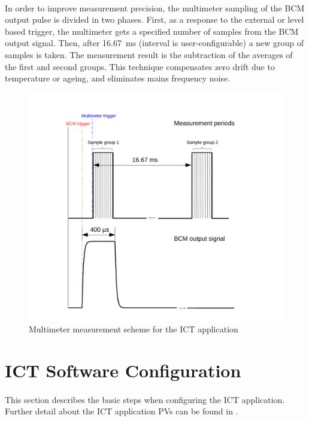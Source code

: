 \documentclass[openany]{article}
\begin{document}
	\paragraph{} In order to improve measurement precision, the multimeter sampling of the BCM output pulse is divided in two phases. First, as a response to the external or level based trigger, the multimeter gets a specified number of samples from the BCM output signal. Then, after \SI{16.67}{\milli\second} (interval is user-configurable) a new group of samples is taken. The measurement result is the subtraction of the averages of the first and second groups. This technique compensates zero drift due to temperature or ageing, and eliminates mains frequency noise.

	\begin{figure}[!h]
	\caption{Multimeter measurement scheme for the ICT application}
	\label{fig:meas-scheme}
	\centering
	\includegraphics[width=1.0\textwidth]{ict-meas-scheme-image}
	\end{figure}
\FloatBarrier

\section{ICT Software Configuration}

	\paragraph{} This section describes the basic steps when configuring the ICT application. Further detail about the ICT application PVs can be found in \emph{}.
\end{document}
